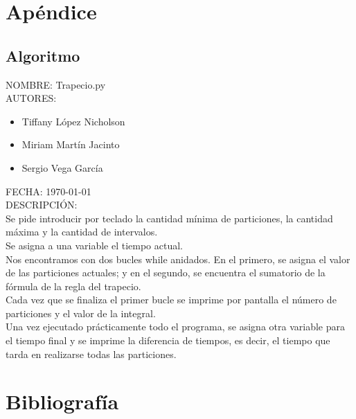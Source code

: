 \documentclass{article}
\begin{document}
   \pagebreak

   \section{Apéndice}
    \subsection{Algoritmo}
   NOMBRE: Trapecio.py\\
   
   AUTORES:

   \begin{itemize}
     \item Tiffany López Nicholson
     \item Miriam Martín Jacinto
     \item Sergio Vega García
   \end{itemize}

   FECHA: \today \\

   DESCRIPCIÓN:\\

     Se pide introducir por teclado la cantidad mínima de particiones, la cantidad máxima y la cantidad de intervalos.\\
	
	Se asigna a una variable el tiempo actual.\\

	Nos encontramos con dos bucles while anidados. En el primero, se asigna el valor de las particiones actuales; y en el segundo, se encuentra el sumatorio de la fórmula de la regla del trapecio.\\

     Cada vez que se finaliza el primer bucle se imprime por pantalla el número de particiones y el valor de la integral.\\

	Una vez ejecutado prácticamente todo el programa, se asigna otra variable para el tiempo final y se imprime la diferencia de tiempos, es decir, el tiempo que tarda en realizarse todas las particiones.\\

  \pagebreak


	\section{Bibliografía}
   
\end{document}
